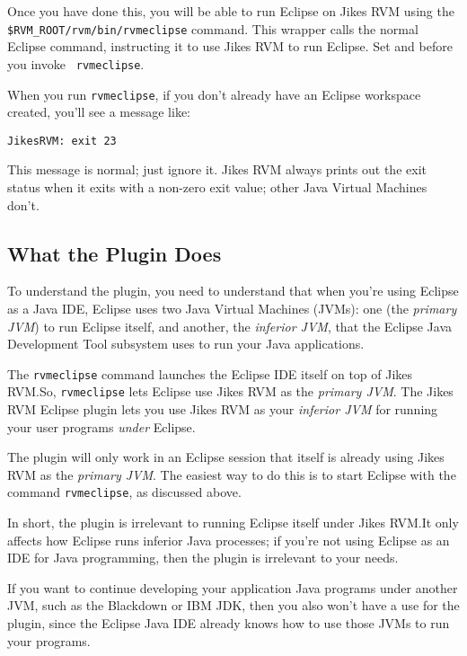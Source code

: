 %
Once you have done this, you will be able to run Eclipse on Jikes RVM
using the {\tt \$RVM\_\-ROOT/\-rvm/\-bin/\-rvmeclipse} command.  This wrapper
calls the normal Eclipse command, instructing it to use Jikes RVM to
run Eclipse.  Set  and  before you invoke {\tt
rvmeclipse}.

When you run {\tt rvmeclipse}, if you don't already
have an Eclipse workspace created, you'll see a message like:
\begin{example}
{\tt JikesRVM: exit 23}
\end{example}
This message is normal; just ignore it.  Jikes RVM always prints out
the exit status when it exits with a non-zero exit value; other Java\TMweb{}
Virtual Machines don't.

\subsection{What the Plugin Does}

To understand the plugin, you need to understand that when you're
using Eclipse as a Java IDE, Eclipse uses two Java Virtual Machines
(JVMs): one (the {\em primary JVM}) to run Eclipse itself, and
another, the {\em inferior JVM}, that the Eclipse Java Development
Tool subsystem uses to run your Java applications.

The {\tt rvmeclipse} command launches the Eclipse IDE itself on top of
Jikes RVM.\@  So, {\tt rvmeclipse} lets Eclipse use Jikes RVM as the
{\em primary JVM}.  The Jikes RVM Eclipse plugin lets you use Jikes RVM as
your {\em inferior JVM} for running your user programs {\em under} Eclipse.

The plugin will only work in an Eclipse session that itself is already
using Jikes RVM as the {\em primary JVM}.  The easiest way to do this
is to start Eclipse with the command {\tt rvmeclipse}, as discussed
above.

In short, the plugin is irrelevant to running Eclipse itself under
Jikes RVM.\@  It only affects how Eclipse runs inferior Java processes;
if you're not using Eclipse as an IDE for Java programming, then
the plugin is irrelevant to your needs.

If you want to continue developing your application Java programs
under another JVM, such as the Blackdown or IBM JDK, then you also
won't have a use for the plugin, since the Eclipse Java IDE already
knows how to use those JVMs to run your programs.


